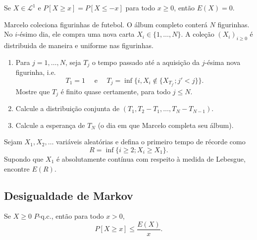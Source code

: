 \begin{exercise}
  Se $X \in \mathcal{L}^1$ e $P[X \geq x] = P[X \leq -x]$ para todo $x \geq 0$, então $E(X) = 0$.
\end{exercise}

\begin{exercise}
  Marcelo coleciona figurinhas de futebol.
  O álbum completo conter\'a $N$ figurinhas. No $i$-ésimo dia, ele compra uma nova carta $X_i \in \{1, \dots, N\}$.
  A cole\c{c}\~ao $(X_i)_{i \geq 0}$ é distribuida de maneira \iid e uniforme nas figurinhas.
  \begin{enumerate}[\quad a)]
  \item Para $j = 1, \dots, N$, seja $T_j$ o tempo passado até a aquisi\c{c}\~ao da $j$-ésima nova figurinha, i.e.
    \begin{equation}
      T_1 = 1 \quad \text{ e } \quad T_j = \inf\{i, X_i \not \in \{X_{T_{j'}}; j' < j\}\}.
    \end{equation}
    Mostre que $T_j$ é finito quase certamente, para todo $j \leq N$.
  \item Calcule a distribuição conjunta de $(T_1, T_2 - T_1, \dots, T_N - T_{N-1})$.
  \item Calcule a esperança de $T_N$ (o dia em que Marcelo completa seu álbum).
  \end{enumerate}
\end{exercise}

\begin{exercise}
  Sejam $X_1, X_2, \dots$ variáveis aleatórias \iid e defina o primeiro tempo de récorde como
  \begin{equation}
    R = \inf\{i \geq 2; X_i \geq X_1\}.
  \end{equation}
  Supondo que $X_1$ é absolutamente contínua com respeito à medida de Lebesgue, encontre $E(R)$.
\end{exercise}

\subsection{Desigualdade de Markov}

\begin{theorem}
  \label{t:markov}
  Se $X \geq 0$ $P$-q.c., então para todo $x > 0$,
  \begin{equation}
    P[X \geq x] \leq \frac{E(X)}{x}.
  \end{equation}
\end{theorem}

